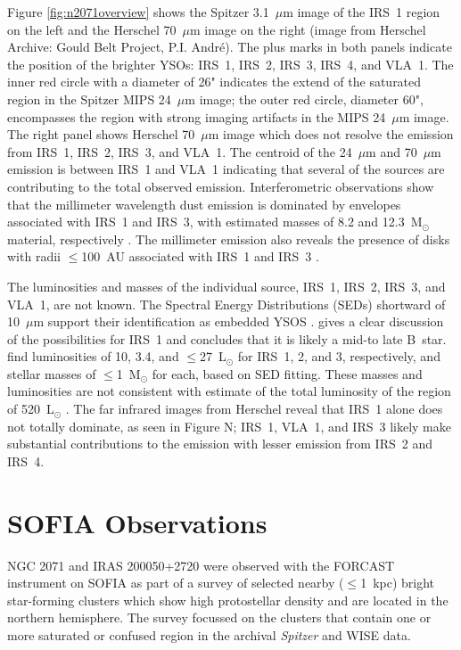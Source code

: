 Figure \ref{fig:n2071overview} shows the Spitzer 3.1~$\mu$m image of the IRS~1 region on the left \citep[image from Spitzer Archive:][]{Megeath2012} and the Herschel 70~$\mu$m image on the right (image from Herschel Archive: Gould Belt Project, P.I. Andr\'e). The plus marks in both panels indicate the position of the brighter YSOs: IRS~1, IRS~2, IRS~3, IRS~4, and VLA~1. The inner red circle with a diameter of 26" indicates the extend of the saturated region in the Spitzer MIPS 24~$\mu$m image; the outer red circle, diameter 60", encompasses the region with strong imaging artifacts in the MIPS 24~$\mu$m image.
The right panel shows Herschel 70~$\mu$m image which does not resolve the emission from IRS~1, IRS~2, IRS~3, and VLA~1. The centroid of the 24~$\mu$m and 70~$\mu$m emission is between IRS~1 and VLA~1 indicating that several of the sources are contributing to the total observed emission. Interferometric observations show that the millimeter wavelength dust emission is dominated by envelopes associated with IRS~1 and IRS~3, with estimated masses of 8.2 and 12.3~M$_\odot$ material, respectively \citep{Kempen2012}. The millimeter emission also reveals the presence of disks with radii $\le$100~AU associated with IRS~1 and IRS~3 \citep{Kempen2012}.

The luminosities and masses of the individual source, IRS~1, IRS~2, IRS~3, and VLA~1, are not known. The Spectral Energy Distributions (SEDs) shortward of 10~$\mu$m support their identification as embedded YSOS \citep{Skinner2009}. \cite{Skinner2009} gives a clear discussion of the possibilities for IRS~1 and concludes that it is likely a mid-to late B~star. \cite{Kempen2012} find luminosities of 10, 3.4, and $\le$27~L$_\odot$ for IRS~1, 2, and 3, respectively, and stellar masses of $\le$1~M$_\odot$ for each, based on SED fitting. These masses and luminosities are not consistent with estimate of the total luminosity of the region of 520~L$_\odot$ \citep{Butner1990}. The far infrared images from Herschel reveal that IRS~1 alone does not totally dominate, as seen in Figure N; IRS~1, VLA~1, and IRS~3 likely make substantial contributions to the emission with lesser emission from IRS~2 and IRS~4.

\section{SOFIA Observations}
NGC 2071 and IRAS 200050+2720 were observed with the FORCAST instrument on SOFIA as part of a survey of selected nearby ($\le$1~kpc) bright star-forming clusters which show high protostellar density \citep{Gutermuth:2009gca} and are located in the northern hemisphere. The survey focussed on the clusters that contain one or more saturated or confused region in the archival \textit{Spitzer} and WISE data.

